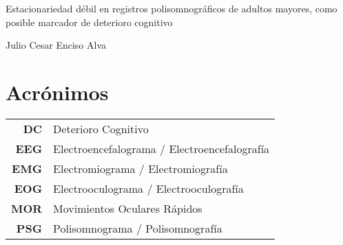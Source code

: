 \documentclass[12pt,a4paper]{mitthesis}
\begin{document}

\begin{center}
\huge{Estacionariedad d\'ebil en registros polisomnogr\'aficos de adultos mayores,
como posible marcador de deterioro cognitivo}


\Large{Julio Cesar Enciso Alva}
\end{center}

\newpage

%


\chapter*{Acr\'onimos}

\begin{tabular}{rl}
\textbf{DC} & Deterioro Cognitivo
\\
\textbf{EEG} & Electroencefalograma / Electroencefalograf\'ia
\\
\textbf{EMG} & Electromiograma / Electromiograf\'ia
\\
\textbf{EOG} & Electrooculograma / Electrooculograf\'ia
\\
\textbf{MOR} & Movimientos Oculares R\'apidos
\\
\textbf{PSG} & Polisomnograma / Polisomnograf\'ia
\end{tabular}


\tableofcontents
\newpage
















\end{document}

